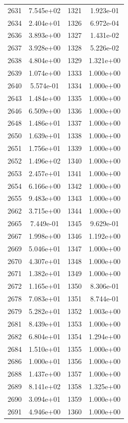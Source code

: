 \documentclass[12pt]{article}
\begin{document}
\begin{longtable}{@{}cccc@{}}
2631 & 7.545e+02 & 1321 & 1.923e-01 \\
2634 & 2.404e+01 & 1326 & 6.972e-04 \\
2636 & 3.893e+00 & 1327 & 1.431e-02 \\
2637 & 3.928e+00 & 1328 & 5.226e-02 \\
2638 & 4.804e+00 & 1329 & 1.321e+00 \\
2639 & 1.074e+00 & 1333 & 1.000e+00 \\
2640 & 5.574e-01 & 1334 & 1.000e+00 \\
2643 & 1.484e+00 & 1335 & 1.000e+00 \\
2646 & 6.509e+00 & 1336 & 1.000e+00 \\
2648 & 1.486e+01 & 1337 & 1.000e+00 \\
2650 & 1.639e+01 & 1338 & 1.000e+00 \\
2651 & 1.756e+01 & 1339 & 1.000e+00 \\
2652 & 1.496e+02 & 1340 & 1.000e+00 \\
2653 & 2.457e+01 & 1341 & 1.000e+00 \\
2654 & 6.166e+00 & 1342 & 1.000e+00 \\
2655 & 9.483e+00 & 1343 & 1.000e+00 \\
2662 & 3.715e+00 & 1344 & 1.000e+00 \\
2665 & 7.449e-01 & 1345 & 9.629e-01 \\
2667 & 1.998e+00 & 1346 & 1.192e+00 \\
2669 & 5.046e+01 & 1347 & 1.000e+00 \\
2670 & 4.307e+01 & 1348 & 1.000e+00 \\
2671 & 1.382e+01 & 1349 & 1.000e+00 \\
2672 & 1.165e+01 & 1350 & 8.306e-01 \\
2678 & 7.083e+01 & 1351 & 8.744e-01 \\
2679 & 5.282e+01 & 1352 & 1.003e+00 \\
2681 & 8.439e+01 & 1353 & 1.000e+00 \\
2682 & 6.804e+01 & 1354 & 1.294e+00 \\
2684 & 1.510e+01 & 1355 & 1.000e+00 \\
2686 & 1.000e+01 & 1356 & 1.000e+00 \\
2688 & 1.437e+00 & 1357 & 1.000e+00 \\
2689 & 8.141e+02 & 1358 & 1.325e+00 \\
2690 & 3.094e+01 & 1359 & 1.000e+00 \\
2691 & 4.946e+00 & 1360 & 1.000e+00 \\

\end{longtable}
\end{document}
